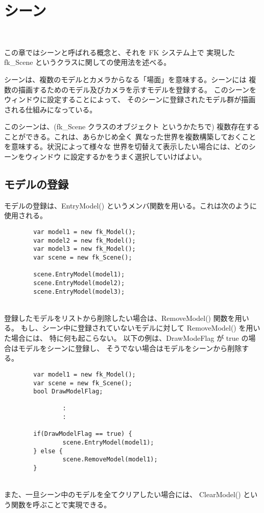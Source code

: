 \chapter{シーン} \label{sec:scene} ~

この章ではシーンと呼ばれる概念と、それを FK システム上で
実現した fk\_Scene というクラスに関しての使用法を述べる。

シーンは、複数のモデルとカメラからなる「場面」を意味する。シーンには
複数の描画するためのモデル及びカメラを示すモデルを登録する。
このシーンをウィンドウに設定することによって、
そのシーンに登録されたモデル群が描画される仕組みになっている。

このシーンは、(fk\_Scene クラスのオブジェクト
というかたちで) 複数存在することができる。これは、あらかじめ全く
異なった世界を複数構築しておくことを意味する。状況によって様々な
世界を切替えて表示したい場合には、どのシーンをウィンドウ
に設定するかをうまく選択していけばよい。

\section{モデルの登録}
モデルの登録は、EntryModel() というメンバ関数を用いる。これは次のように
使用される。
\\
\begin{breakbox}
\begin{verbatim}
        var model1 = new fk_Model();
        var model2 = new fk_Model();
        var model3 = new fk_Model();
        var scene = new fk_Scene();

        scene.EntryModel(model1);
        scene.EntryModel(model2);
        scene.EntryModel(model3);
\end{verbatim}
\end{breakbox}
~ \\
登録したモデルをリストから削除したい場合は、RemoveModel() 関数を用いる。
もし、シーン中に登録されていないモデルに対して RemoveModel() を用いた場合には、
特に何も起こらない。
以下の例は、DrawModeFlag が true の場合はモデルをシーンに登録し、
そうでない場合はモデルをシーンから削除する。
\\
\begin{breakbox}
\begin{verbatim}
        var model1 = new fk_Model();
        var scene = new fk_Scene();
        bool DrawModelFlag;

                :
                :

        if(DrawModelFlag == true) {
                scene.EntryModel(model1);
        } else {
                scene.RemoveModel(model1);
        }
\end{verbatim}
\end{breakbox}
~ \\
また、一旦シーン中のモデルを全てクリアしたい場合には、
ClearModel() という関数を呼ぶことで実現できる。

